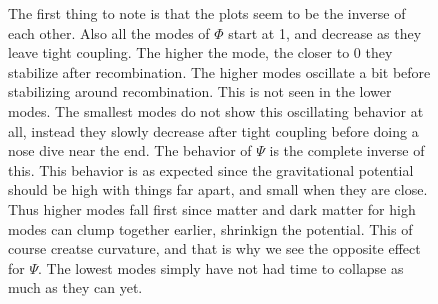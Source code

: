 \documentclass[a4paper]{report}
\begin{document}
\begin{figure}[ht]
\caption{The first thing to note is that the plots seem to be the inverse of each other. Also all the modes of $\Phi$ start at 1, and decrease as they leave tight coupling. The higher the mode, the closer to 0 they stabilize after recombination. The higher modes oscillate a bit before stabilizing around recombination. This is not seen in the lower modes. The smallest modes do not show this oscillating behavior at all, instead they slowly decrease after tight coupling before doing a nose dive near the end. The behavior of $\Psi$ is the complete inverse of this. This behavior is as expected since the gravitational potential should be high with things far apart, and small when they are close. Thus higher modes fall first since matter and dark matter for high modes can clump together earlier, shrinkign the potential. This of course creatse curvature, and that is why we see the opposite effect for $\Psi$. The lowest modes simply have not had time to collapse as much as they can yet.}
\end{figure}
\end{document}
